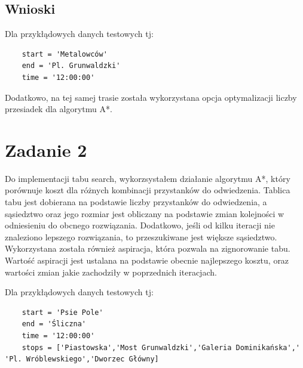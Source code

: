 \documentclass{article}
\begin{document}
\subsection*{Wnioski}
Dla przykłądowych danych testowych tj:
\begin{verbatim}
    start = 'Metalowców'
    end = 'Pl. Grunwaldzki'
    time = '12:00:00'
\end{verbatim}


Dodatkowo, na tej samej trasie została wykorzystana opcja optymalizacji liczby przesiadek dla algorytmu A*.



\section{Zadanie 2}
Do implementacji tabu search, wykorzsystałem działanie algorytmu A*, który porównuje koszt dla różnych kombinacji przystanków do odwiedzenia. 
Tablica tabu jest dobierana na podstawie liczby przystanków do odwiedzenia, a sąsiedztwo oraz jego rozmiar jest obliczany na podstawie zmian kolejności w odniesieniu do obcnego rozwiązania.
Dodatkowo, jeśli od kilku iteracji nie znaleziono lepszego rozwiązania, to przeszukiwane jest większe sąsiedztwo. Wykorzystana została również aspiracja, która pozwala na
zignorowanie tabu. Wartość aspiracji jest ustalana na podstawie obecnie najlepszego kosztu, oraz wartości zmian jakie zachodziły w poprzednich iteracjach.

Dla przykłądowych danych testowych tj:
\begin{verbatim}
    start = 'Psie Pole'
    end = 'Śliczna'
    time = '12:00:00'
    stops = ['Piastowska','Most Grunwaldzki','Galeria Dominikańska',' 'Pl. Wróblewskiego','Dworzec Główny]
\end{verbatim}
\end{document}
